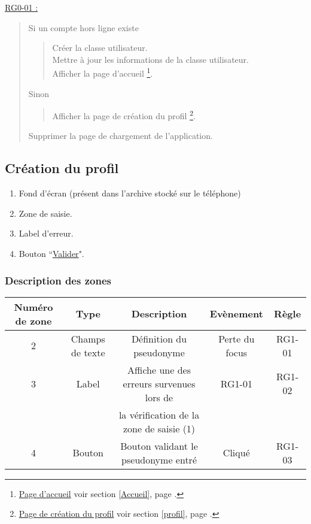\documentclass{report}
\begin{document}
		\underline{RG0-01 :}
		\begin{quote}
			Si un compte hors ligne existe
			\begin{quote}
				Créer la classe utilisateur.\\
				Mettre à jour les informations de la classe utilisateur.\\
				Afficher la page d'accueil%
				\footnote[1]{
					\hyperlink{Page d'accueil}{Page d'accueil}
					\og voir section \ref{Accueil}, page \pageref{Accueil}.\fg
				}.
			\end{quote}
			Sinon
			\begin{quote}
				Afficher la page de création du profil%
				\footnote[2]{
					\hyperlink{Création du profil}{Page de création du profil}
					\og voir section \ref{profil}, page \pageref{profil}.\fg
				}.
			\end{quote}
			Supprimer la page de chargement de l'application.
		\end{quote}
	
\newpage

	\subsection{Création du profil}
		\hypertarget{profil}{}
		\label{profil}

		\begin{center}
			
		\end{center}

		\begin{enumerate}
		  \item Fond d'écran (présent dans l'archive stocké sur le téléphone)
		  \item Zone de saisie.
		  \item Label d'erreur.
		  \item Bouton ``\hyperlink{Accueil}{Valider}".
		\end{enumerate}

		\subsubsection{Description des zones}
				
			\begin{tabular}{|c|c|c|c|c|} \hline
				Numéro de zone & Type  & Description & Evènement &	Règle \\\hline 
				2 & Champs de texte & Définition du pseudonyme & Perte du focus & RG1-01 \\\hline
				3 & Label & Affiche une des erreurs survenues lors de & RG1-01 & RG1-02 \\
				  &       & la vérification de la zone de saisie (1) &  & \\\hline
				4 & Bouton         & Bouton validant le pseudonyme entré & Cliqué & RG1-03 \\\hline
			\end{tabular}
\end{document}
